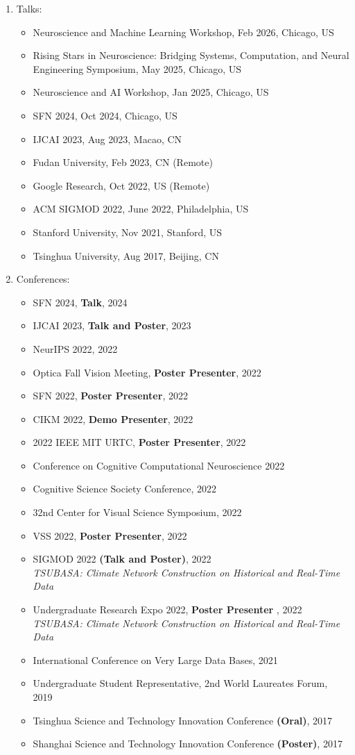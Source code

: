 \documentclass[10pt,letterpaper]{article}
\begin{document}
\begin{enumerate}
\item Talks:
\begin{itemize}
\item Neuroscience and Machine Learning Workshop, Feb 2026, Chicago, US
\item Rising Stars in Neuroscience: Bridging Systems, Computation, and Neural Engineering Symposium, May 2025, Chicago, US
\item Neuroscience and AI Workshop, Jan 2025, Chicago, US
\item SFN 2024, Oct 2024, Chicago, US
\item IJCAI 2023, Aug 2023, Macao, CN
\item Fudan University, Feb 2023, CN (Remote)
\item Google Research, Oct 2022, US (Remote)
\item ACM SIGMOD 2022, June 2022, Philadelphia, US
\item Stanford University, Nov 2021, Stanford, US
\item Tsinghua University, Aug 2017, Beijing, CN
\end{itemize}
\item Conferences:
\begin{itemize}
    \item SFN 2024, \textbf{Talk}, 2024
    \item IJCAI 2023, \textbf{Talk and Poster}, 2023
    \item NeurIPS 2022, 2022
    \item Optica Fall Vision Meeting, \textbf{Poster Presenter}, 2022
    \item SFN 2022, \textbf{Poster Presenter}, 2022
    \item CIKM 2022, \textbf{Demo Presenter}, 2022
    \item 2022 IEEE MIT URTC, \textbf{Poster Presenter}, 2022
    \item Conference on Cognitive Computational Neuroscience 2022
    \item Cognitive Science Society Conference, 2022
    \item 32nd Center for Visual Science Symposium, 2022
    \item VSS 2022, \textbf{Poster Presenter}, 2022
    \item SIGMOD 2022 \textbf{(Talk and Poster)}, 2022\\
    \textit{TSUBASA: Climate Network Construction on Historical and Real-Time Data}
    \item Undergraduate Research Expo 2022, \textbf{Poster Presenter} , 2022\\
    \textit{TSUBASA: Climate Network Construction on Historical and Real-Time Data}
    \item International Conference on Very Large Data Bases, 2021
    \item  Undergraduate Student Representative, 2nd World Laureates Forum, 2019
    \item  Tsinghua Science and Technology Innovation Conference \textbf{(Oral)}, 2017
    \item  Shanghai Science and Technology Innovation Conference \textbf{(Poster)}, 2017
\end{itemize}


\end{enumerate}
\end{document}
